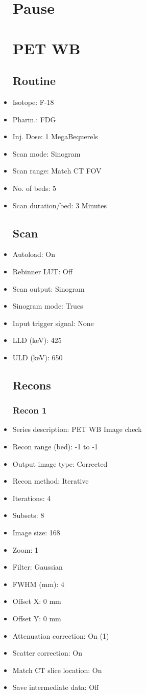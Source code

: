 \documentclass[12pt]{article}
\begin{document}
\begin{itemize}[noitemsep]
\section{Pause}
\section{PET WB}\subsection{Routine}
\item Isotope: F-18
\item Pharm.: FDG
\item Inj. Dose: 1 MegaBequerels
\item Scan mode: Sinogram
\item Scan range: Match CT FOV
\item No. of beds: 5
\item Scan duration/bed: 3 Minutes
\subsection{Scan}
\item Autoload: On
\item Rebinner LUT: Off
\item Scan output: Sinogram
\item Sinogram mode: Trues
\item Input trigger signal: None
\item LLD (keV): 425
\item ULD (keV): 650
\subsection{Recons}
\subsubsection{Recon 1}
\item Series description: PET WB Image check
\item Recon range (bed): -1 to -1
\item Output image type: Corrected
\item Recon method: Iterative
\item Iterations: 4
\item Subsets: 8
\item Image size: 168
\item Zoom: 1
\item Filter: Gaussian
\item FWHM (mm): 4
\item Offset X: 0 mm
\item Offset Y: 0 mm
\item Attenuation correction: On (1)
\item Scatter correction: On
\item Match CT slice location: On
\item Save intermediate data: Off

\end{itemize}
\end{document}
